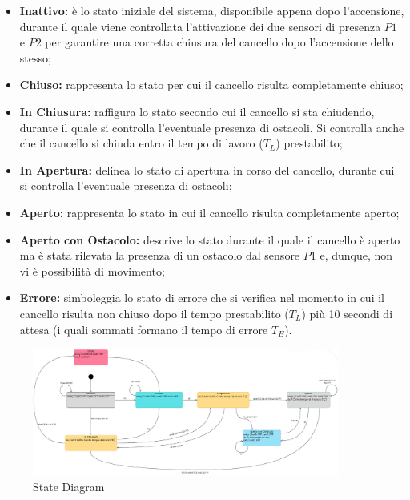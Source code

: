 \begin{itemize}
    \item \textbf{Inattivo:} è lo stato iniziale del sistema, disponibile appena dopo l'accensione, durante il quale viene controllata l'attivazione dei due sensori di presenza $P1$ e $P2$ per garantire una corretta chiusura del cancello dopo l'accensione dello stesso;
    
    \item \textbf{Chiuso:} rappresenta lo stato per cui il cancello risulta completamente chiuso;
    
    \item \textbf{In Chiusura:} raffigura lo stato secondo cui il cancello si sta chiudendo, durante il quale si controlla l'eventuale presenza di ostacoli. Si controlla anche che il cancello si chiuda entro il tempo di lavoro ($T_L$) prestabilito; 
    
    \item \textbf{In Apertura:} delinea lo stato di apertura in corso del cancello, durante cui si controlla l'eventuale presenza di ostacoli;
    
    \item \textbf{Aperto:} rappresenta lo stato in cui il cancello risulta completamente aperto;
    
    \item \textbf{Aperto con Ostacolo:} descrive lo stato durante il quale il cancello è aperto ma è stata rilevata la presenza di un ostacolo dal sensore $P1$ e, dunque, non vi è possibilità di movimento;
    
    \item \textbf{Errore:} simboleggia lo stato di errore che si verifica nel momento in cui il cancello risulta non chiuso dopo il tempo prestabilito ($T_L$) più 10 secondi di attesa (i quali sommati formano il tempo di errore $T_E$).
\end{itemize}

\vspace{10mm}

\begin{figure}[H]
    \centering
    \includegraphics[width=0.9\textwidth]{figures/statediagram.png}
    \caption{State Diagram}
    \label{state}
\end{figure}


